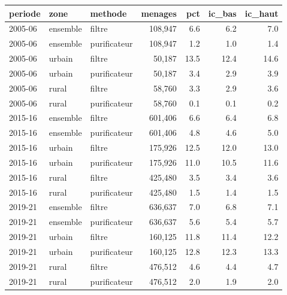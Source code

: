 \begin{tabular}{lllrrrr}
\toprule
periode & zone & methode & menages & pct & ic\_bas & ic\_haut
\\
\midrule
2005-06 & ensemble & filtre & 108,947 & 6.6 & 6.2 & 7.0 \\
2005-06 & ensemble & purificateur & 108,947 & 1.2 & 1.0 & 1.4 \\
2005-06 & urbain & filtre & 50,187 & 13.5 & 12.4 & 14.6 \\
2005-06 & urbain & purificateur & 50,187 & 3.4 & 2.9 & 3.9 \\
2005-06 & rural & filtre & 58,760 & 3.3 & 2.9 & 3.6 \\
2005-06 & rural & purificateur & 58,760 & 0.1 & 0.1 & 0.2 \\
2015-16 & ensemble & filtre & 601,406 & 6.6 & 6.4 & 6.8 \\
2015-16 & ensemble & purificateur & 601,406 & 4.8 & 4.6 & 5.0 \\
2015-16 & urbain & filtre & 175,926 & 12.5 & 12.0 & 13.0 \\
2015-16 & urbain & purificateur & 175,926 & 11.0 & 10.5 & 11.6 \\
2015-16 & rural & filtre & 425,480 & 3.5 & 3.4 & 3.6 \\
2015-16 & rural & purificateur & 425,480 & 1.5 & 1.4 & 1.5 \\
2019-21 & ensemble & filtre & 636,637 & 7.0 & 6.8 & 7.1 \\
2019-21 & ensemble & purificateur & 636,637 & 5.6 & 5.4 & 5.7 \\
2019-21 & urbain & filtre & 160,125 & 11.8 & 11.4 & 12.2 \\
2019-21 & urbain & purificateur & 160,125 & 12.8 & 12.3 & 13.3 \\
2019-21 & rural & filtre & 476,512 & 4.6 & 4.4 & 4.7 \\
2019-21 & rural & purificateur & 476,512 & 2.0 & 1.9 & 2.0 \\
\bottomrule
\end{tabular}

